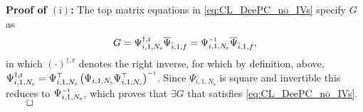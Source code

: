 \noindent\textbf{Proof of $(\mathrm{i})$:} The top matrix equations in \eqref{eq:CL_DeePC_no_IVs} specify $G$ as
\begin{align}\label{eq:G_sols}
    G = \Psi_{i,1,N_\mathrm{s}}^{\dagger,\mathrm{r}}\overline{\Psi}_{\hat{i},1,f} = \Psi_{i,1,N_\mathrm{s}}\inv\overline{\Psi}_{\hat{i},1,f},
\end{align}
in which $(\cdot)^{\dagger,\mathrm{r}}$ denotes the right inverse, for which by definition, above, $\Psi_{i,1,N_\mathrm{s}}^{\dagger,\mathrm{r}}=\Psi_{i,1,N_\mathrm{s}}^\top \left(\Psi_{i,1,N_\mathrm{s}}\Psi_{i,1,N_\mathrm{s}}^\top\right)\inv$. Since $\Psi_{i,1,N_\mathrm{s}}$ is square and invertible this reduces to $\Psi_{i,1,N_\mathrm{s}}\inv$, which proves that $\exists G$ that satisfies \eqref{eq:CL_DeePC_no_IVs}. $\hfill\qed$
% 


